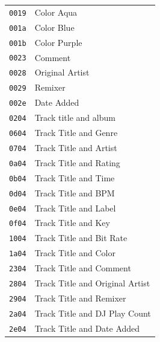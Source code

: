 \documentclass[11pt]{article}
\begin{document}
\begin{longtabu}{rl}
  {\tt 0019} & Color Aqua \\

  {\tt 001a} & Color Blue \\

  {\tt 001b} & Color Purple \\

  {\tt 0023} & Comment \\

  {\tt 0028} & Original Artist \\

  {\tt 0029} & Remixer \\

  {\tt 002e} & Date Added \\

  {\tt 0204} & Track title and album \\

  {\tt 0604} & Track Title and Genre \\

  {\tt 0704} & Track Title and Artist \\

  {\tt 0a04} & Track Title and Rating \\

  {\tt 0b04} & Track Title and Time \\

  {\tt 0d04} & Track Title and BPM \\

  {\tt 0e04} & Track Title and Label \\

  {\tt 0f04} & Track Title and Key \\

  {\tt 1004} & Track Title and Bit Rate \\

  {\tt 1a04} & Track Title and Color \\

  {\tt 2304} & Track Title and Comment \\

  {\tt 2804} & Track Title and Original Artist \\

  {\tt 2904} & Track Title and Remixer \\

  {\tt 2a04} & Track Title and DJ Play Count \\

  {\tt 2e04} & Track Title and Date Added \\

\end{longtabu}
\end{document}
